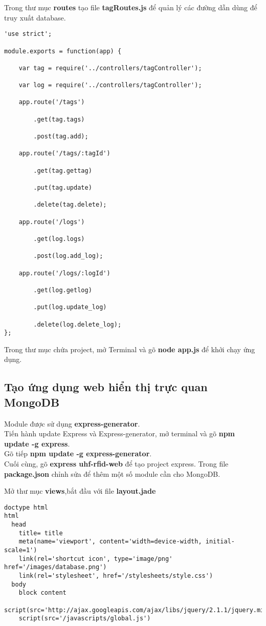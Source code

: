 Trong thư mục \textbf{routes} tạo file  \textbf{tagRoutes.js} để quản lý các đường dẫn dùng để truy xuất database.
\begin{lstlisting}
'use strict';

module.exports = function(app) {

    var tag = require('../controllers/tagController');

    var log = require('../controllers/tagController');

    app.route('/tags')

        .get(tag.tags)

        .post(tag.add);

    app.route('/tags/:tagId')

        .get(tag.gettag)

        .put(tag.update)
        
        .delete(tag.delete);

    app.route('/logs')

        .get(log.logs)

        .post(log.add_log);

    app.route('/logs/:logId')

        .get(log.getlog)

        .put(log.update_log)
        
        .delete(log.delete_log);
};
\end{lstlisting}
Trong thư mục chứa project, mở Terminal và gõ \textbf{node app.js} để khởi chạy ứng dụng.
\label{ref{fig4_8}}

\subsection{Tạo ứng dụng web hiển thị trực quan MongoDB}
Module được sử dụng \textbf{express-generator}.\\
Tiến hành update Express và Express-generator, mở terminal và gõ \textbf{npm update -g express}.\\
Gõ tiếp \textbf{npm update -g express-generator}.\\
Cuối cùng, gõ \textbf{express uhf-rfid-web} để tạo project express.
Trong file \textbf{package.json} chỉnh sửa để thêm một số module cần cho MongoDB.
\label{ref{fig4_9}}

Mở thư mục \textbf{views},bắt đầu với file \textbf{layout.jade}
\begin{lstlisting}
doctype html
html
  head
    title= title
    meta(name='viewport', content='width=device-width, initial-scale=1')
    link(rel='shortcut icon', type='image/png' href='/images/database.png')
    link(rel='stylesheet', href='/stylesheets/style.css')
  body
    block content
    script(src='http://ajax.googleapis.com/ajax/libs/jquery/2.1.1/jquery.min.js')
    script(src='/javascripts/global.js')
\end{lstlisting}

